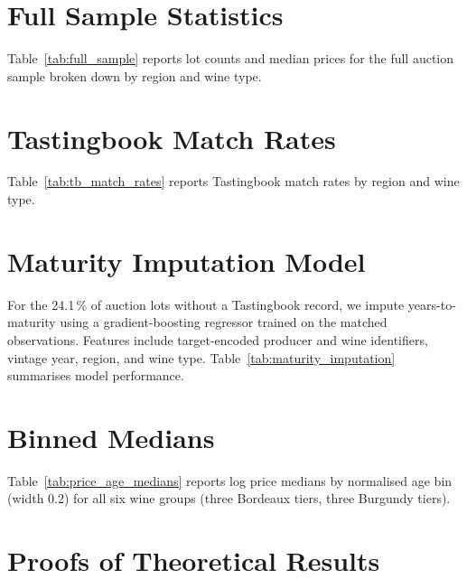 
\appendix

\section{Full Sample Statistics}
\label{app:full_sample}

Table~\ref{tab:full_sample} reports lot counts and median prices for the full auction
sample broken down by region and wine type.



\section{Tastingbook Match Rates}
\label{app:tb_match}

Table~\ref{tab:tb_match_rates} reports Tastingbook match rates by region and wine type.



\section{Maturity Imputation Model}
\label{app:imputation}

For the 24.1\,\% of auction lots without a Tastingbook record, we impute years-to-maturity
using a gradient-boosting regressor trained on the matched observations. Features include
target-encoded producer and wine identifiers, vintage year, region, and wine type.
Table~\ref{tab:maturity_imputation} summarises model performance.



\section{Binned Medians}
\label{app:medians}

Table~\ref{tab:price_age_medians} reports log price medians by normalised age bin (width 0.2)
for all six wine groups (three Bordeaux tiers, three Burgundy tiers).



\section{Proofs of Theoretical Results}
\label{app:proofs}

